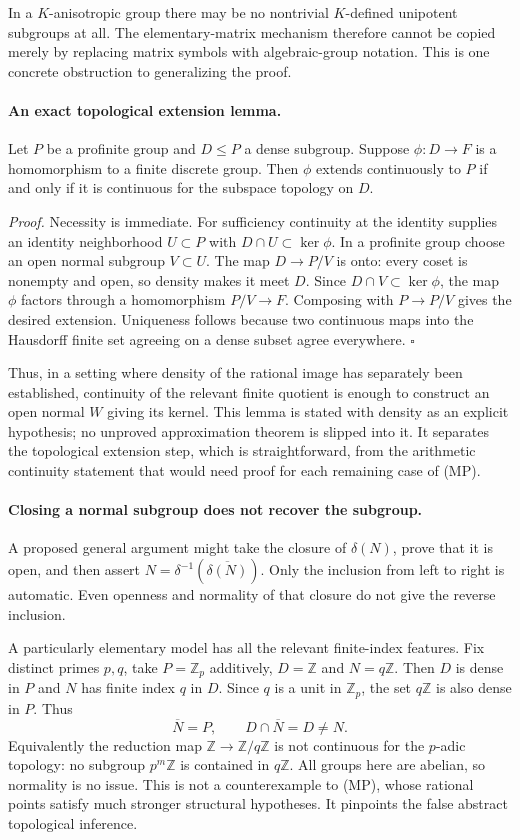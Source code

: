 \documentclass[11pt]{article}
\begin{document}
In a $K$-anisotropic group there may be no nontrivial $K$-defined
unipotent subgroups at all. The elementary-matrix mechanism therefore
cannot be copied merely by replacing matrix symbols with algebraic-group
notation. This is one concrete obstruction to generalizing the proof.

\paragraph{An exact topological extension lemma.}
Let $P$ be a profinite group and $D\le P$ a dense subgroup. Suppose
$\phi:D\to F$ is a homomorphism to a finite discrete group. Then
$\phi$ extends continuously to $P$ if and only if it is continuous
for the subspace topology on $D$.

\emph{Proof.} Necessity is immediate. For sufficiency continuity at the
identity supplies an identity neighborhood $U\subset P$ with
$D\cap U\subset\ker\phi$. In a profinite group choose an open normal
subgroup $V\subset U$. The map $D\to P/V$ is onto: every coset is
nonempty and open, so density makes it meet $D$. Since
$D\cap V\subset\ker\phi$, the map $\phi$ factors through a
homomorphism $P/V\to F$. Composing with $P\to P/V$ gives the desired
extension. Uniqueness follows because two continuous maps into the
Hausdorff finite set agreeing on a dense subset agree everywhere.
\hfill$\square$

Thus, in a setting where density of the rational image has separately
been established, continuity of the relevant finite quotient is enough
to construct an open normal $W$ giving its kernel. This lemma is stated
with density as an explicit hypothesis; no unproved approximation theorem
is slipped into it. It separates the topological extension step, which
is straightforward, from the arithmetic continuity statement that would
need proof for each remaining case of (MP).

\paragraph{Closing a normal subgroup does not recover the subgroup.}
A proposed general argument might take the closure of $\delta(N)$,
prove that it is open, and then assert
$N=\delta^{-1}(\overline{\delta(N)})$. Only the inclusion from left
to right is automatic. Even openness and normality of that closure
do not give the reverse inclusion.

A particularly elementary model has all the relevant finite-index
features. Fix distinct primes $p,q$, take $P=\mathbb Z_p$ additively,
$D=\mathbb Z$ and $N=q\mathbb Z$. Then $D$ is dense in $P$ and
$N$ has finite index $q$ in $D$. Since $q$ is a unit in $\mathbb Z_p$,
the set $q\mathbb Z$ is also dense in $P$. Thus
\[
 \overline N=P,\qquad D\cap\overline N=D\ne N.
\]
Equivalently the reduction map $\mathbb Z\to\mathbb Z/q\mathbb Z$
is not continuous for the $p$-adic topology: no subgroup $p^m\mathbb Z$
is contained in $q\mathbb Z$. All groups here are abelian, so normality
is no issue. This is not a counterexample to (MP), whose rational points
satisfy much stronger structural hypotheses. It pinpoints the false
abstract topological inference.
\end{document}
